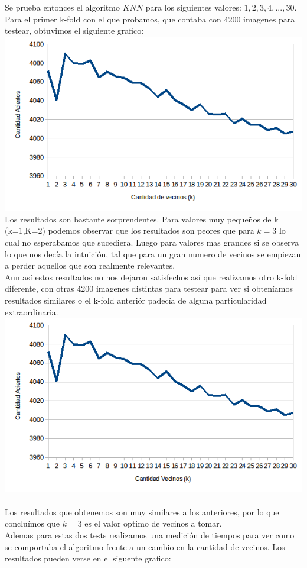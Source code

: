 Se prueba entonces el algoritmo $KNN$ para los siguientes valores: $1,2,3,4,...,30$.
\\
Para el primer k-fold con el que probamos, que contaba con 4200 imagenes para testear, obtuvimos el siguiente grafico:
\\
\includegraphics[scale=0.55]{nuevosResultados/knn/1.png}\\

Los resultados son bastante sorprendentes. Para valores muy pequeños de k (k=1,K=2) podemos observar que los resultados son peores que para $k=3$ lo cual no esperabamos que sucediera. Luego para valores mas grandes si se observa lo que nos decía la intuición, tal que para un gran numero de vecinos se empiezan a perder aquellos que son realmente relevantes.
\\
Aun así estos resultados no nos dejaron satisfechos así que realizamos otro k-fold diferente, con otras 4200 imagenes distintas para testear para ver si obteníamos resultados similares o el k-fold anteriór padecía de alguna particularidad extraordinaria.
\\
\includegraphics[scale=0.55]{nuevosResultados/knn/2.png}\\
\\
Los resultados que obtenemos son muy similares a los anteriores, por lo que concluímos que $k=3$ es el valor optimo de vecinos a tomar.
\\
Ademas para estas dos tests realizamos una medición de tiempos para ver como se comportaba el algoritmo frente a un cambio en la cantidad de vecinos. Los resultados pueden verse en el siguente grafico:

